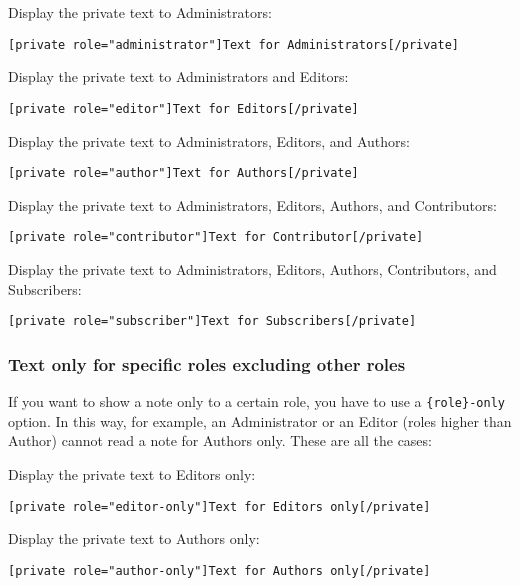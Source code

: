 Display the private text to Administrators:

\begin{lstlisting}
[private role="administrator"]Text for Administrators[/private]
\end{lstlisting}

Display the private text to Administrators and Editors:

\begin{lstlisting}
[private role="editor"]Text for Editors[/private]
\end{lstlisting}

Display the private text to Administrators, Editors, and Authors:

\begin{lstlisting}
[private role="author"]Text for Authors[/private]
\end{lstlisting}

Display the private text to Administrators, Editors, Authors, and Contributors:

\begin{lstlisting}
[private role="contributor"]Text for Contributor[/private]
\end{lstlisting}

Display the private text to Administrators, Editors, Authors, Contributors, and
Subscribers:

\begin{lstlisting}
[private role="subscriber"]Text for Subscribers[/private]
\end{lstlisting}

\subsubsection{Text only for specific roles excluding other roles}

If you want to show a note only to a certain role, you have to use a
\verb+{role}-only+ option. In this way, for example, an Administrator or an
Editor (roles higher than Author) cannot read a note for Authors only. These are
all the cases:

Display the private text to Editors only:

\begin{lstlisting}
[private role="editor-only"]Text for Editors only[/private]
\end{lstlisting}

Display the private text to Authors only:

\begin{lstlisting}
[private role="author-only"]Text for Authors only[/private]
\end{lstlisting}


